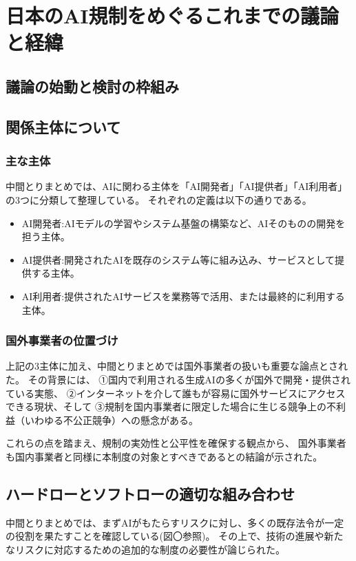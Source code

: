 \chapter{日本のAI規制をめぐるこれまでの議論と経緯}

\section{議論の始動と検討の枠組み}

\section{関係主体について}

\subsection{主な主体}
中間とりまとめでは、AIに関わる主体を「AI開発者」「AI提供者」「AI利用者」の3つに分類して整理している。
それぞれの定義は以下の通りである。

\begin{itemize}
  \item AI開発者:AIモデルの学習やシステム基盤の構築など、AIそのものの開発を担う主体。
  \item AI提供者:開発されたAIを既存のシステム等に組み込み、サービスとして提供する主体。
  \item AI利用者:提供されたAIサービスを業務等で活用、または最終的に利用する主体。
\end{itemize}

\subsection{国外事業者の位置づけ}
上記の3主体に加え、中間とりまとめでは国外事業者の扱いも重要な論点とされた。
その背景には、
①国内で利用される生成AIの多くが国外で開発・提供されている実態、
②インターネットを介して誰もが容易に国外サービスにアクセスできる現状、そして
③規制を国内事業者に限定した場合に生じる競争上の不利益（いわゆる不公正競争）への懸念がある。

これらの点を踏まえ、規制の実効性と公平性を確保する観点から、
国外事業者も国内事業者と同様に本制度の対象とすべきであるとの結論が示された。


\section{ハードローとソフトローの適切な組み合わせ}
中間とりまとめでは、まずAIがもたらすリスクに対し、多くの既存法令が一定の役割を果たすことを確認している(図〇参照)。
その上で、技術の進展や新たなリスクに対応するための追加的な制度の必要性が論じられた。

